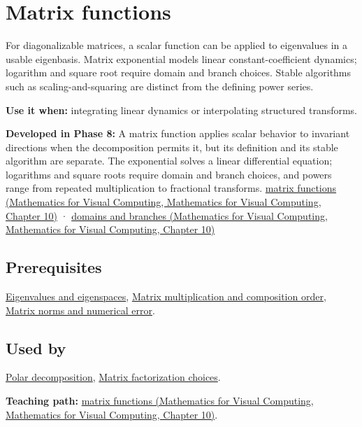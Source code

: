 \hypertarget{appendix-0f4bc2bf2b1f}{}\label{referencestart:appendix-0f4bc2bf2b1f}
\section{Matrix functions}\label{appendix-0f4bc2bf2b1f-matrix-functions}

For diagonalizable matrices, a scalar function can be applied to eigenvalues in a usable eigenbasis. Matrix exponential models linear constant-coefficient dynamics; logarithm and square root require domain and branch choices. Stable algorithms such as scaling-and-squaring are distinct from the defining power series.

\textbf{Use it when:} integrating linear dynamics or interpolating structured transforms.

\textbf{Developed in Phase 8:} A matrix function applies scalar behavior to invariant directions when the decomposition permits it, but its definition and its stable algorithm are separate. The exponential solves a linear differential equation; logarithms and square roots require domain and branch choices, and powers range from repeated multiplication to fractional transforms. \href{../02-Mathematics-for-Visual-Computing/main.pdf\#nameddest=02-foundations-ii-ch026-matrix-functions-turn-repeated-linear-actions-into-one-operator}{matrix functions (Mathematics for Visual Computing, Mathematics for Visual Computing, Chapter 10)} · \href{../02-Mathematics-for-Visual-Computing/main.pdf\#nameddest=02-foundations-ii-ch026-logarithms-and-square-roots-need-domains-and-branches}{domains and branches (Mathematics for Visual Computing, Mathematics for Visual Computing, Chapter 10)}

\subsection{Prerequisites}\label{appendix-0f4bc2bf2b1f-prerequisites}

\hyperref[appendix-0b3be18411f9]{Eigenvalues and eigenspaces}, \hyperref[appendix-ab31ef447dbf]{Matrix multiplication and composition order}, \hyperref[appendix-f8657bac66e5]{Matrix norms and numerical error}.

\subsection{Used by}\label{appendix-0f4bc2bf2b1f-used-by}

\hyperref[appendix-73f5bcf7a462]{Polar decomposition}, \hyperref[appendix-221a483bec2d]{Matrix factorization choices}.

\textbf{Teaching path:} \href{../02-Mathematics-for-Visual-Computing/main.pdf\#nameddest=02-foundations-ii-ch026-matrix-functions-turn-repeated-linear-actions-into-one-operator}{matrix functions (Mathematics for Visual Computing, Mathematics for Visual Computing, Chapter 10)}.
